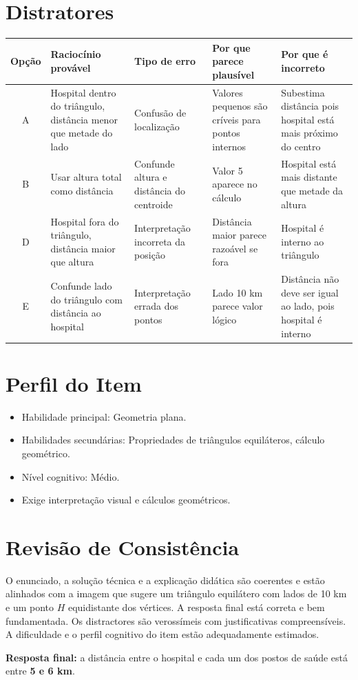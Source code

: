 \documentclass{article}
\begin{document}
\section*{Distratores}

\begin{tabular}{|c|p{4cm}|p{4cm}|p{4cm}|p{5cm}|}
\hline
Opção & Raciocínio provável & Tipo de erro & Por que parece plausível & Por que é incorreto \\ \hline
A & Hospital dentro do triângulo, distância menor que metade do lado & Confusão de localização & Valores pequenos são críveis para pontos internos & Subestima distância pois hospital está mais próximo do centro \\ \hline
B & Usar altura total como distância & Confunde altura e distância do centroide & Valor 5 aparece no cálculo & Hospital está mais distante que metade da altura \\ \hline
D & Hospital fora do triângulo, distância maior que altura & Interpretação incorreta da posição & Distância maior parece razoável se fora & Hospital é interno ao triângulo \\ \hline
E & Confunde lado do triângulo com distância ao hospital & Interpretação errada dos pontos & Lado 10 km parece valor lógico & Distância não deve ser igual ao lado, pois hospital é interno \\ \hline
\end{tabular}

\section*{Perfil do Item}

\begin{itemize}
  \item Habilidade principal: Geometria plana.
  \item Habilidades secundárias: Propriedades de triângulos equiláteros, cálculo geométrico.
  \item Nível cognitivo: Médio.
  \item Exige interpretação visual e cálculos geométricos.
\end{itemize}

\section*{Revisão de Consistência}

O enunciado, a solução técnica e a explicação didática são coerentes e estão alinhados com a imagem que sugere um triângulo equilátero com lados de 10 km e um ponto $H$ equidistante dos vértices. A resposta final está correta e bem fundamentada. Os distractores são verossímeis com justificativas compreensíveis. A dificuldade e o perfil cognitivo do item estão adequadamente estimados.

\bigskip

\textbf{Resposta final:} a distância entre o hospital e cada um dos postos de saúde está entre \textbf{5 e 6 km}.
\end{document}
